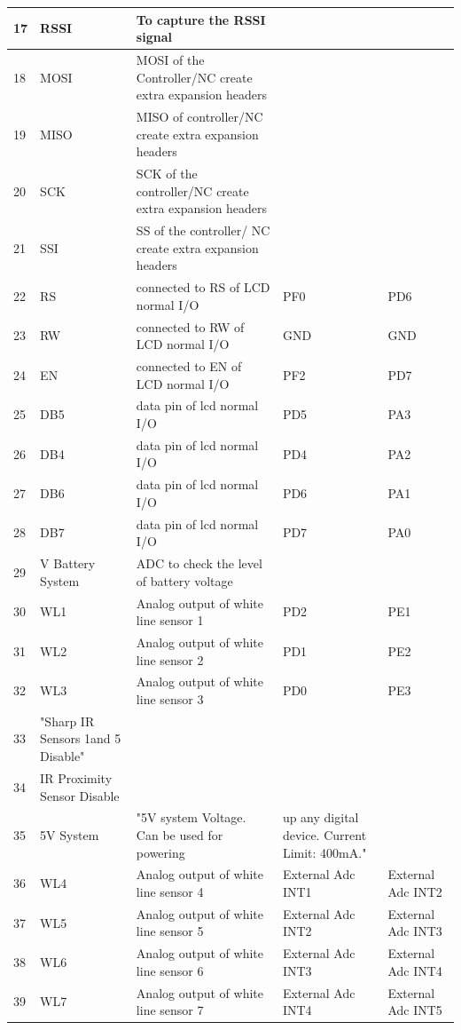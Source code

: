 \documentclass[a4paper,10pt,oneside]{article}
\begin{document}
{\begin{longtable}{|p{}|p{}|p{}|p{}|p{}|}
				17&	RSSI&	To capture the RSSI signal& &\\ \hline	
				18&	MOSI&	MOSI of the Controller/NC create extra expansion headers& &\\ \hline	
				19&	MISO&	MISO of controller/NC create extra expansion headers & &\\ \hline
				20&	SCK&	SCK of the controller/NC create extra expansion headers&&	\\ \hline
				21&	SSI	&SS of the controller/ NC create extra expansion headers	&&\\ \hline
				22&	RS&	connected to RS of LCD normal I/O&	PF0 & PD6\\ \hline
				23&	RW&	connected to RW of LCD normal I/O&	GND & GND\\ \hline
				24&	EN&	connected to EN of LCD normal I/O&	PF2 & PD7\\ \hline
				25&	DB5	&data pin of lcd normal I/O	&PD5 & PA3\\ \hline
				26&	DB4&	data pin of lcd normal I/O&	PD4 & PA2\\ \hline
				27&	DB6	&data pin of lcd normal I/O	&PD6 & PA1\\ \hline
				28&	DB7	&data pin of lcd normal I/O	&PD7 & PA0\\ \hline
				29&	V Battery System&	ADC to check the level of battery voltage &	&\\ \hline
				30&	WL1&	Analog output of white line sensor 1	&PD2 & PE1\\ \hline
				31&	WL2&	Analog output of white line sensor 2&	PD1 & PE2\\ \hline
				32&	WL3&	Analog output of white line sensor 3&	PD0 & PE3\\ \hline
				33&	"Sharp IR Sensors 1and 5 Disable" & &	&	\\ \hline
				34&	IR Proximity Sensor Disable& & &	\\ \hline	
				35&	5V System&	"5V system Voltage. Can be used for powering&
				up any digital device. Current Limit: 400mA." & \\ \hline
				36&	WL4&	Analog output of white line sensor 4&	External Adc INT1&	External Adc INT2\\ \hline
				37&	WL5&	Analog output of white line sensor 5&	External Adc INT2&	External Adc INT3\\ \hline
				38&	WL6&	Analog output of white line sensor 6	&External Adc INT3&	External Adc INT4\\ \hline
				39&	WL7&	Analog output of white line sensor 7&	External Adc INT4&	External Adc INT5\\ \hline

\end{longtable}}
\end{document}
